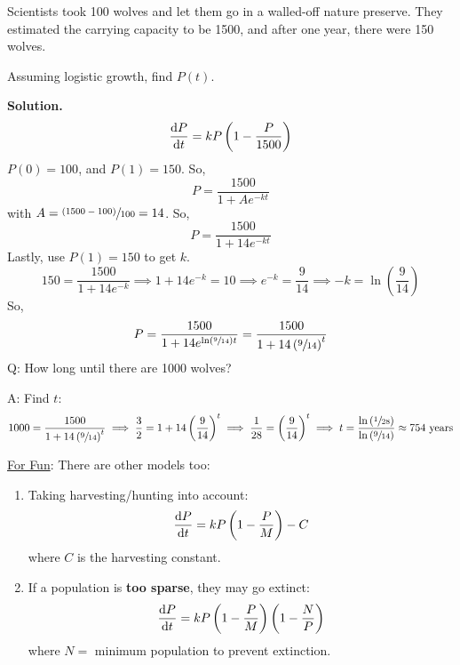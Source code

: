 \begin{Example}{}{}
    Scientists took 100 wolves and let them go in a walled-off nature preserve. They
    estimated the carrying capacity to be 1500, and after one year, there were 150 wolves.

    Assuming logistic growth, find $ P(t) $.

    \textbf{Solution.}
    \[ \odv{P}{t}=kP\left(1-\frac{P}{1500}\right)  \]
    $ P(0)=100 $, and $ P(1)=150 $. So,
    \[ P=\frac{1500}{1+Ae^{-kt}}  \]
    with $ A=\sfrac{(1500-100)}{100}=14  $. So,
    \[ P=\frac{1500}{1+14e^{-kt}}  \]
    Lastly, use $ P(1)=150 $ to get $ k $.
    \[ 150=\frac{1500}{1+14e^{-k}}\implies 1+14e^{-k}=10\implies e^{-k}=\frac{9}{14} \implies
        -k=\ln\left( \frac{9}{14} \right) \]
    So,
    \[ P=\frac{1500}{1+14e^{\ln\left( \sfrac{9}{14}  \right)t}} =\frac{1500}{1+14\left( \sfrac{9}{14}  \right)^t} \]
    Q\@: How long until there are 1000 wolves?

    A\@: Find $ t $:
    \[ 1000=\frac{1500}{1+14\left( \sfrac{9}{14}  \right)^t}
        \implies \frac{3}{2} =1+14\left( \frac{9}{14}  \right)^t
        \implies \frac{1}{28} =\left( \frac{9}{14} \right)^t
        \implies t=\frac{\ln\left( \sfrac{1}{28}  \right)}{\ln\left( \sfrac{9}{14}\right)}
        \approx 754\text{ years}\]
\end{Example}

\underline{For Fun}: There are other models too:
\begin{enumerate}[label=(\Roman*)]
    \item Taking harvesting/hunting into account:
          \[ \odv{P}{t}=kP\left( 1-\frac{P}{M} \right)-C \]
          where $ C $ is the harvesting constant.
    \item If a population is \textbf{too sparse}, they may go extinct:
          \[ \odv{P}{t}=kP\left( 1-\frac{P}{M} \right)\left( 1-\frac{N}{P}  \right)  \]
          where $ N= $ minimum population to prevent extinction.
\end{enumerate}
